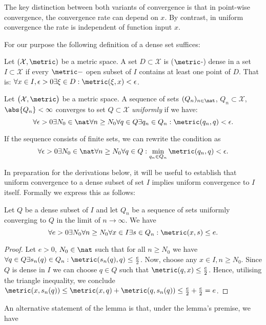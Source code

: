 The key distinction between both variants of convergence is that in point-wise convergence, the convergence rate can depend on $x$. By contrast, in uniform convergence the rate is independent of function input $x$.


For our purpose the following definition of a dense set suffices:
\begin{defn}[Dense] Let $(\mathcal X,\metric)$ be a metric space.  
A set $D \subset \mathcal X$ is ($\metric$-) dense in a set $I \subset \mathcal X$ if every  $\metric-$ open subset of $I$ contains at least one point of $D$. That is:
$\forall x \in I, \epsilon > 0 \exists \xi \in D: \metric(\xi,x) < \epsilon$.     
\end{defn}


\begin{defn}\label{def:uniform_setconvergence}
Let $\bigl(\mathcal X,\metric\bigr)$ be a metric space.  
A sequence of sets $(Q_n)_{n \in \nat}$, $Q_n \subset \mathcal X$, $\abs{Q_n} < \infty$ converges to set $Q \subset \mathcal X$ \textit{uniformly} if we have:
\[\forall \epsilon > 0 \exists N_0 \in \nat \forall n \geq N_0 \forall q \in Q \exists q_n \in Q_n : \metric(q_n,q) < \epsilon. \]

If the sequence consists of finite sets, we can rewrite the condition as 
\[\forall \epsilon > 0 \exists N_0 \in \nat \forall n \geq N_0 \forall q \in Q : \min_{q_n \in Q_n} \metric(q_n,q) < \epsilon. \]

\end{defn}

In preparation for the derivations below, it will be useful to establish that uniform convergence to a dense subset of set $I$ implies uniform convergence to $I$ itself. Formally we express this as follows:

\begin{lem}
\label{lem:unifdenseset1}
Let $Q$ be a dense subset of $I$ and let $Q_n$ be a sequence of sets uniformly converging to $Q$ in the limit of $n \to \infty$. We have \[\forall e > 0 \exists N_0 \forall n \geq N_0 \forall x \in I \exists s \in Q_n: \metric(x,s) \leq e. \]


\begin{proof}
Let $e>0$, $N_0 \in \nat$ such that for all $n \geq N_0$ we have $\forall q \in Q \exists s_n(q) \in Q_n: \metric(s_n(q),q) \leq \frac{e}{2}$. 
Now, choose any $x \in I, n \geq N_0$. Since $Q$ is dense in $I$ we can choose $q \in Q$ such that $\metric(q,x) \leq \frac{e}{2}$. 
Hence, utilising the triangle inequality, we conclude $\metric(x,s_n(q)) \leq \metric(x,q) +\metric(q,s_n(q)) \leq \frac{e}{2} + \frac{e}{2} = e$.
\end{proof}
\end{lem}
An alternative statement of the lemma is that, under the lemma's premise, we have 

